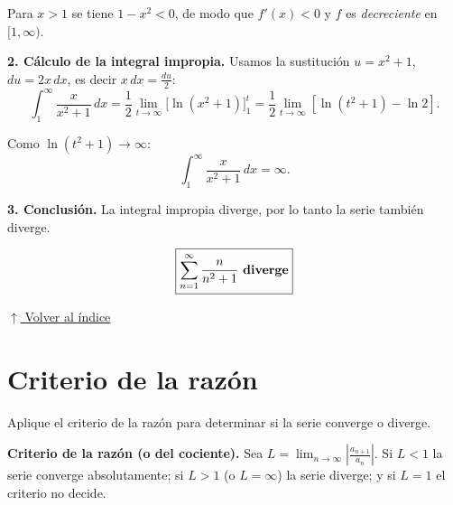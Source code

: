 \documentclass[12pt]{article}
\newcommand{\volverindice}{%
    \vspace{1em}%
    \begin{flushright}%
        \hyperlink{indice}{\small $\uparrow$ Volver al índice}%
    \end{flushright}%
}
\begin{document}
\begin{enumerate}[label=\alph*.-]
    Para $x>1$ se tiene $1-x^{2}<0$, de modo que $f'(x)<0$ y $f$ es
    \emph{decreciente} en $[1,\infty)$.

    \textbf{2. Cálculo de la integral impropia.} Usamos la sustitución
    $u=x^{2}+1$, $du=2x\,dx$, es decir $x\,dx=\frac{du}{2}$:
    \[
    \int_{1}^{\infty}\frac{x}{x^{2}+1}\,dx
    =\frac12\lim_{t\to\infty}\Big[\ln(x^{2}+1)\Big]_{1}^{t}
    =\frac12\lim_{t\to\infty}\left[\ln(t^{2}+1)-\ln 2\right].
    \]

    Como $\ln(t^{2}+1)\to\infty$:
    \[
    \int_{1}^{\infty}\frac{x}{x^{2}+1}\,dx=\infty .
    \]

    \textbf{3. Conclusión.} La integral impropia diverge, por lo tanto la serie
    también diverge.

    \[
    \boxed{
    \sum_{n=1}^{\infty}\frac{n}{n^{2}+1}
    \text{ \textbf{diverge}}
    }
    \]

\end{enumerate}

\volverindice
\newpage


\section{Criterio de la razón}

Aplique el criterio de la razón para determinar si la serie converge o diverge.

\vspace{0.5em}
\textbf{Criterio de la razón (o del cociente).} Sea
$\displaystyle L=\lim_{n\to\infty}\left|\frac{a_{n+1}}{a_n}\right|$. Si $L<1$
la serie converge absolutamente; si $L>1$ (o $L=\infty$) la serie diverge; y si
$L=1$ el criterio no decide.
\end{document}
